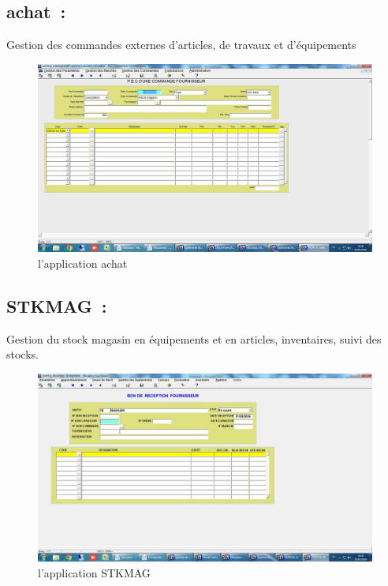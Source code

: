 \documentclass[12pt]{rapportINPTCLOUD}
\begin{document}
\subsection{achat :}   Gestion des commandes externes d'articles, de travaux et d'équipements
\begin{figure}[H]
	\centering
	\includegraphics[width=1\linewidth]{img/e.jpg}
	\caption{l'application achat}
	\label{fig:achat}
\end{figure}
\newpage
\subsection{STKMAG :} Gestion du stock magasin en équipements et en articles, inventaires, suivi des stocks.
\begin{figure}[H]
	\centering
	\includegraphics[width=1\linewidth]{img/f.jpg}
	\caption{l'application STKMAG}
	\label{fig:STKMAG}
\end{figure}
\end{document}
